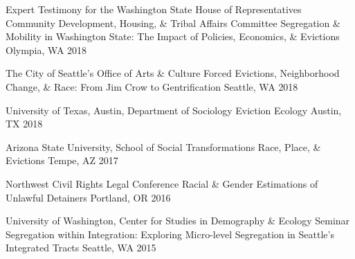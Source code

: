 \begin{cventries}
  \cventry
    {Expert Testimony for the Washington State House of Representatives Community Development, Housing, \& Tribal Affairs Committee} %
    {Segregation \& Mobility in Washington State: The Impact of Policies, Economics, \& Evictions} %
    {Olympia, WA} %
    {2018} %
    {}

  \cventry
    {The City of Seattle’s Office of Arts \& Culture} %
    {Forced Evictions, Neighborhood Change, \& Race: From Jim Crow to Gentrification} %
    {Seattle, WA} %
    {2018} %
    {}

  \cventry
    {University of Texas, Austin, Department of Sociology} %
    {Eviction Ecology} %
    {Austin, TX} %
    {2018} %
    {}

  \cventry
    {Arizona State University, School of Social Transformations} %
    {Race, Place, \& Evictions} %
    {Tempe, AZ} %
    {2017} %
    {}

  \cventry
    {Northwest Civil Rights Legal Conference} %
    {Racial \& Gender Estimations of Unlawful Detainers} %
    {Portland, OR} %
    {2016} %
    {}
    
    
  \cventry
    {University of Washington, Center for Studies in Demography \& Ecology Seminar} %
    {Segregation within Integration: Exploring Micro-level Segregation in Seattle's Integrated Tracts} %
    {Seattle, WA} %
    {2015} %
    {}
    
    

\end{cventries}
